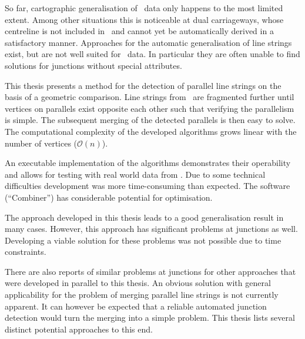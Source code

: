 \documentclass[../main/thesis.tex]{subfiles}
\begin{document}
So far, cartographic generalisation of \osm\ data only happens to the most limited extent.
Among other situations this is noticeable at dual carriageways, whose centreline is not included in \osm\ and cannot yet be automatically derived in a satisfactory manner.
Approaches for the automatic generalisation of line strings exist, but are not well suited for \osm\ data.
In particular they are often unable to find solutions for junctions without special attributes.

This thesis presents a method for the detection of parallel line strings on the basis of a geometric comparison.
Line strings from \osm\ are fragmented further until vertices on parallels exist opposite each other such that verifying the parallelism is simple.
The subsequent merging of the detected parallels is then easy to solve.
The computational complexity of the developed algorithms grows linear with the number of vertices ($\mathcal{O}(n)$).

An executable implementation of the algorithms demonstrates their operability and allows for testing with real world data from \osm.
Due to some technical difficulties development was more time-consuming than expected.
The software (“Combiner”) has considerable potential for optimisation.

The approach developed in this thesis leads to a good generalisation result in many cases.
However, this approach has significant problems at junctions as well.
Developing a viable solution for these problems was not possible due to time constraints.

There are also reports of similar problems at junctions for other approaches that were developed in parallel to this thesis.
An obvious solution with general applicability for the problem of merging parallel line strings is not currently apparent.
It can however be expected that a reliable automated junction detection would turn the merging into a simple problem.
This thesis lists several distinct potential approaches to this end.



\end{document}
